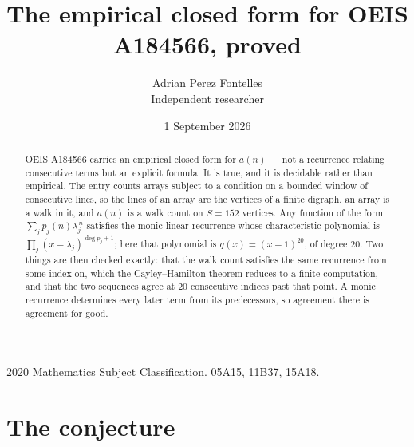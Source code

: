 \documentclass[11pt,a4paper]{article}
\title{The empirical closed form for OEIS A184566, proved}
\author{Adrian Perez Fontelles\\ \small Independent researcher}
\date{1 September 2026}
\theoremstyle{plain}
\theoremstyle{definition}
\begin{document}
\maketitle

\begin{abstract}
OEIS A184566 carries an empirical closed form for $a(n)$ --- not a recurrence relating
consecutive terms but an explicit formula. It is true, and it is decidable rather than
empirical. The entry counts arrays subject to a condition on a bounded window of consecutive lines, so the lines of an array are the
vertices of a finite digraph, an array is a walk in it, and $a(n)$ is a walk count on
$S=152$ vertices. Any function of the form $\sum_j p_j(n)\lambda_j^{\,n}$ satisfies the
monic linear recurrence whose characteristic polynomial is
$\prod_j(x-\lambda_j)^{\deg p_j+1}$; here that polynomial is $q(x)=(x-1)^{20}$, of degree
$20$. Two things are then checked exactly: that the walk count satisfies the same
recurrence from some index on, which the Cayley--Hamilton theorem reduces to a finite
computation, and that the two sequences agree at $20$ consecutive indices past that
point. A monic recurrence determines every later term from its predecessors, so agreement
there is agreement for good.
\end{abstract}

\noindent\small 2020 Mathematics Subject Classification. 05A15, 11B37, 15A18.\normalsize

\section{The conjecture}
\end{document}
